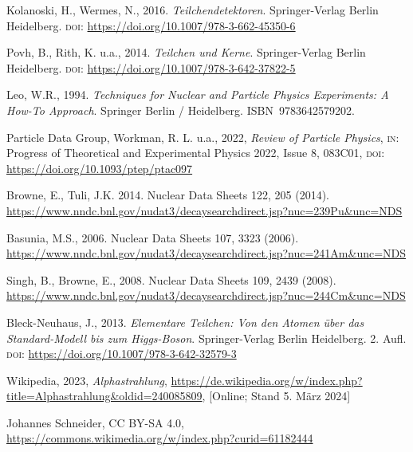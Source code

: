 \documentclass{scrartcl}
\begin{document}





\clearpage
\begin{thebibliography}{1}
	Kolanoski, H., Wermes, N., 2016. \emph{Teilchendetektoren}. Springer-Verlag Berlin Heidelberg. \textsc{doi:} \url{https://doi.org/10.1007/978-3-662-45350-6}
	
	Povh, B., Rith, K. u.a., 2014. \emph{Teilchen und Kerne}. Springer-Verlag Berlin Heidelberg. \textsc{doi:} \url{https://doi.org/10.1007/978-3-642-37822-5}
	
	Leo, W.R., 1994. \emph{Techniques for Nuclear and Particle Physics Experiments: A How-To Approach}. Springer Berlin / Heidelberg. ISBN 9783642579202. 
	
	Particle Data Group, Workman, R. L. u.a., 2022, \emph{Review of Particle Physics}, \textsc{in:} Progress of Theoretical and Experimental Physics 2022, Issue 8, 083C01, \textsc{doi:} \url{https://doi.org/10.1093/ptep/ptac097}
	
	Browne, E., Tuli, J.K. 2014. Nuclear Data Sheets 122, 205 (2014). \url{https://www.nndc.bnl.gov/nudat3/decaysearchdirect.jsp?nuc=239Pu&unc=NDS}
	
	Basunia, M.S., 2006. Nuclear Data Sheets 107, 3323 (2006). \url{https://www.nndc.bnl.gov/nudat3/decaysearchdirect.jsp?nuc=241Am&unc=NDS}
	
	Singh, B., Browne, E., 2008. Nuclear Data Sheets 109, 2439 (2008). \url{https://www.nndc.bnl.gov/nudat3/decaysearchdirect.jsp?nuc=244Cm&unc=NDS}

	Bleck-Neuhaus, J., 2013. \emph{Elementare Teilchen: Von den Atomen über das Standard-Modell bis zum Higgs-Boson}. Springer-Verlag Berlin Heidelberg. 2. Aufl. \textsc{doi:} \url{https://doi.org/10.1007/978-3-642-32579-3}
	
	Wikipedia, 2023, \emph{Alphastrahlung}, \url{https://de.wikipedia.org/w/index.php?title=Alphastrahlung&oldid=240085809},
	[Online; Stand 5. März 2024]
	
	Johannes Schneider, CC BY-SA 4.0, \url{ https://commons.wikimedia.org/w/index.php?curid=61182444}
\end{thebibliography}


	
\end{document}
